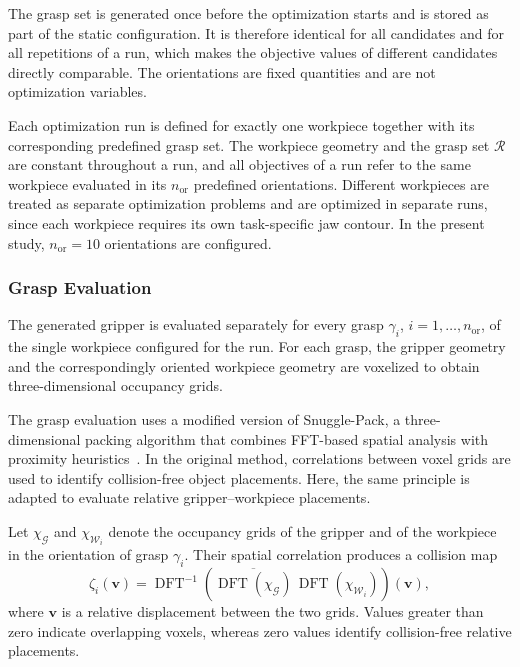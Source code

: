 The grasp set is generated once before the optimization starts and is stored as part of the static
configuration. It is therefore identical for all candidates and for all repetitions of a run, which
makes the objective values of different candidates directly comparable. The orientations are fixed
quantities and are not optimization variables.

Each optimization run is defined for exactly one workpiece together with its corresponding
predefined grasp set. The workpiece geometry and the grasp set $\mathcal{R}$ are constant throughout
a run, and all objectives of a run refer to the same workpiece evaluated in its $n_{\mathrm{or}}$
predefined orientations. Different workpieces are treated as separate optimization problems and are
optimized in separate runs, since each workpiece requires its own task-specific jaw contour. In the
present study, $n_{\mathrm{or}} = 10$ orientations are configured.

\subsubsection{Grasp Evaluation}
\label{sec:grasp_eval}

The generated gripper is evaluated separately for every grasp $\gamma_i$, $i = 1,\ldots,n_{\mathrm{or}}$,
of the single workpiece configured for the run. For each grasp, the gripper geometry and the
correspondingly oriented workpiece geometry are voxelized to obtain three-dimensional occupancy
grids.

The grasp evaluation uses a modified version of Snuggle-Pack, a three-dimensional packing algorithm
that combines FFT-based spatial analysis with proximity heuristics~\cite{snuggle_pack}. In the
original method, correlations between voxel grids are used to identify collision-free object
placements. Here, the same principle is adapted to evaluate relative gripper--workpiece placements.

Let $\chi_{\mathcal{G}}$ and $\chi_{\mathcal{W}_i}$ denote the occupancy grids of the gripper and of
the workpiece in the orientation of grasp $\gamma_i$. Their spatial correlation produces a collision
map
\begin{equation}
    \zeta_i(\mathbf{v})
    =
    \operatorname{DFT}^{-1}
    \left(
        \overline{\operatorname{DFT}(\chi_{\mathcal{G}})}
        \,\operatorname{DFT}(\chi_{\mathcal{W}_i})
    \right)(\mathbf{v}),
\end{equation}
where $\mathbf{v}$ is a relative displacement between the two grids. Values greater than zero
indicate overlapping voxels, whereas zero values identify collision-free relative placements.

